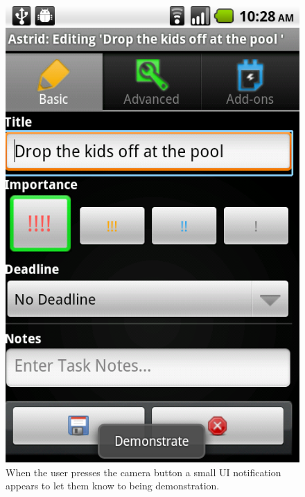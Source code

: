 \documentclass[letterpaper]{article}
\begin{document}
\begin{figure}[t]
\begin{center}
\includegraphics[scale=0.3]{fig/screenshot-cropped.png}
\end{center}
\caption{When the user presses the camera button a small UI notification appears to let them know to being demonstration.}
\label{fig:interface}
\end{figure}
\end{document}
